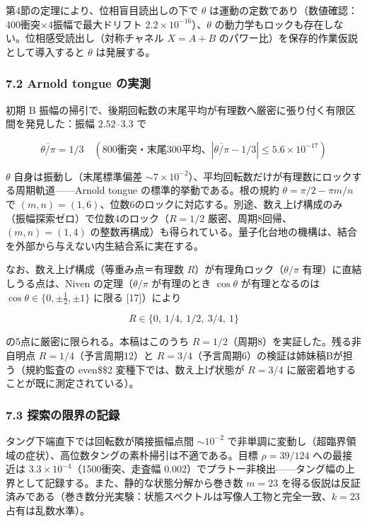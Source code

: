 \documentclass[
  a4paper,
]{ltjsarticle}
\begin{document}
第4節の定理により、位相盲目読出しの下で \(\theta\)
は運動の定数であり（数値確認：400衝突×4振幅で最大ドリフト
\(2.2\times10^{-16}\)）、\(\theta\)
の動力学もロックも存在しない。位相感受読出し（対称チャネル \(X=A+B\)
のパワー比）を保存的作業仮説として導入すると \(\theta\) は発展する。

\subsubsection{7.2 Arnold tongue
の実測}\label{arnold-tongue-ux306eux5b9fux6e2c}

初期 B
振幅の掃引で、後期回転数の末尾平均が有理数へ厳密に張り付く有限区間を発見した：振幅
\(2.52\)--\(3.3\) で

\[
\overline{\theta/\pi}=1/3
\quad(\text{800衝突・末尾300平均、}|{\overline{\theta/\pi}}-1/3|\le5.6\times10^{-17})
\]

\(\theta\) 自身は振動し（末尾標準偏差
\(\sim7\times10^{-2}\)）、平均回転数だけが有理数にロックする周期軌道------Arnold
tongue の標準的挙動である。根の規約 \(\theta=\pi/2-\pi m/n\) で
\((m,n)=(1,6)\)、位数6のロックに対応する。別途、数え上げ構成のみ（振幅探索ゼロ）で位数4のロック（\(R=1/2\)
厳密、周期8回帰、\((m,n)=(1,4)\)
の整数再構成）も得られている。量子化台地の機構は、結合を外部から与えない内生結合系に実在する。

なお、数え上げ構成（等重み点＝有理数
\(R\)）が有理角ロック（\(\theta/\pi\) 有理）に直結しうる点は、Niven
の定理（\(\theta/\pi\) が有理のとき \(\cos\theta\) が有理となるのは
\(\cos\theta\in\{0,\pm\tfrac12,\pm1\}\) に限る {[}17{]}）により

\[
R \in \{0,\ 1/4,\ 1/2,\ 3/4,\ 1\}
\]

の5点に厳密に限られる。本稿はこのうち
\(R=1/2\)（周期8）を実証した。残る非自明点 \(R=1/4\)（予言周期12）と
\(R=3/4\)（予言周期6）の検証は姉妹稿Bが担う（規約監査の even\$\ge\$2
変種下では、数え上げ状態が \(R=3/4\)
に厳密着地することが既に測定されている）。

\subsubsection{7.3
探索の限界の記録}\label{ux63a2ux7d22ux306eux9650ux754cux306eux8a18ux9332}

タング下端直下では回転数が隣接振幅点間 \(\sim10^{-2}\)
で非単調に変動し（超臨界領域の症状）、高位数タングの素朴掃引は不適である。目標
\(\rho=39/124\) への最接近は \(3.3\times10^{-4}\)（1500衝突、走査幅
\(0.002\)）でプラトー非検出------タング幅の上界として記録する。また、静的な状態分解から巻き数
\(m=23\)
を得る仮説は反証済みである（巻き数分光実験：状態スペクトルは写像人工物と完全一致、\(k=23\)
占有は乱数水準）。
\end{document}
